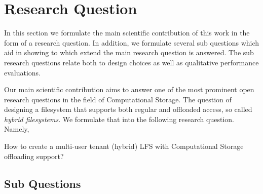 \section{Research Question}

In this section we formulate the main scientific contribution of this work in
the form of a research question. In addition, we formulate several sub questions
which aid in showing to which extend the main research question is answered.
The sub research questions relate both to design choices as well as qualitative
performance evaluations.

Our main scientific contribution aims to answer one of the most prominent open
research questions in the field of Computational Storage. The question of
designing a filesystem that supports both regular and offloaded access, so
called \textit{hybrid filesystems}. We formulate that into the following
research question. Namely,

\begin{displayquote}
    How to create a multi-user tenant (hybrid) LFS with Computational Storage
    offloading support?
\end{displayquote}

\subsection{Sub Questions}


